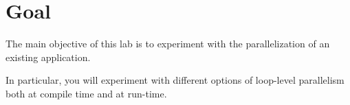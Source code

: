 \section{Goal}

The main objective of this lab is to experiment with the parallelization of an
existing application.

In particular, you will experiment with different options of loop-level
parallelism both at compile time and at run-time.
